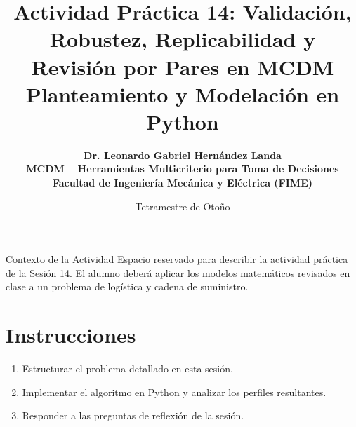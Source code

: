 \documentclass[11pt,a4paper]{article}
\title{%
  \sffamily\bfseries\color{UANLblue}%
  Actividad Práctica 14: Validación, Robustez, Replicabilidad y Revisión por Pares en MCDM\\
  \large Planteamiento y Modelación en Python
}
\author{%
  \sffamily\bfseries\color{FIMEdarkgray}%
  Dr. Leonardo Gabriel Hernández Landa\\
  \small MCDM -- Herramientas Multicriterio para Toma de Decisiones\\
  \small\color{FIMEgreen}Facultad de Ingeniería Mecánica y Eléctrica (FIME)
}
\date{\sffamily Tetramestre de Otoño}
\begin{document}
\maketitle
\thispagestyle{fancy}

\begin{brandbox}{Contexto de la Actividad}
  Espacio reservado para describir la actividad práctica de la Sesión 14. El alumno deberá aplicar los modelos matemáticos revisados en clase a un problema de logística y cadena de suministro.
\end{brandbox}

\section{Instrucciones}
\begin{enumerate}
    \item Estructurar el problema detallado en esta sesión.
    \item Implementar el algoritmo en Python y analizar los perfiles resultantes.
    \item Responder a las preguntas de reflexión de la sesión.
\end{enumerate}
\end{document}
